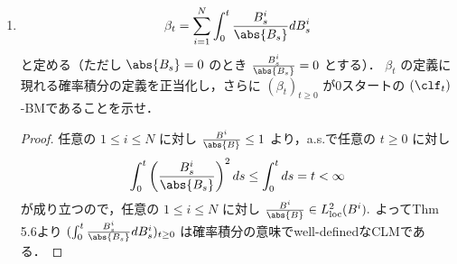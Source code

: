\documentclass{jsarticle}
\begin{document}
\begin{enumerate}
\begin{proof}
        次に $(\sum_{i=1}^{N}\int_{0}^{t}2B_s^i dB_s^i)_{t\ge0}$ がtrue martingaleであることを示す．
        Doob's ineq. in $L^2$ より
        \begin{align}
            E[\gen{\sum_{i=1}^{N}\int_{0}^{\cdot}2B_s^i dB_s^i, \sum_{i=1}^{N}\int_{0}^{\cdot}2B_s^i dB_s^i}_t]
            &= E[\sum_{i=1}^{N}\int_{0}^{t}(2B_s^i)^2 ds] \\
            &\le 4t\sum_{i=1}^{N}E[\sup_{0\le s\le t}(B_s^i)^2] \\
            &\le 4t2^2\sum_{i=1}^{N}E[(B_s^i)^2] \\
            &= 16t(\abs{x}^2+Nt).
        \end{align}
        \begin{screen}
            $\because)$
            任意の $1\le i\le N$ に対し
            \begin{align}
                t
                &= E[(B_t^i-x_i)^2] \\
                &= E[(B_t^i)^2]
                - 2x_iE[B_t^i]
                + E[x_i^2] \\
                &= E[(B_t^i)^2] - x_i^2
            \end{align}
            より $E[(B_t^i)^2]=x_i^2+t.$
        \end{screen}

        よってThm. 4.13(ii)より $(\sum_{i=1}^{N}\int_{0}^{t}2B_s^i dB_s^i)_{t\ge0}$ はtrue martingale.
    \end{proof}
    
    \item
    \begin{align}
        \beta_t
        = \sum_{i=1}^{N}\int_{0}^{t}\frac{B_{s}^{i}}{\abs{B_s}}dB_s^i
    \end{align}
    と定める（ただし $\abs{B_s}=0$ のとき $\frac{B_{s}^{i}}{\abs{B_s}}=0$ とする）．
    $\beta_t$ の定義に現れる確率積分の定義を正当化し，さらに $(\beta_t)_{t\ge0}$ が0スタートの $(\clf_t)$-BMであることを示せ．
    \begin{proof}
        任意の $1\le i\le N$ に対し $\frac{B^i}{\abs{B}}\le1$ より，a.s.で任意の $t\ge0$ に対し
        \begin{align}
            \int_0^t \left(\frac{B_s^i}{\abs{B_s}}\right)^2 ds
            \le \int_0^t ds = t < \infty
        \end{align}
        が成り立つので，任意の $1\le i\le N$ に対し $\frac{B^i}{\abs{B}}\in L_{\mathrm{loc}}^2(B^i).$
        よってThm 5.6より $(\int_{0}^{t}\frac{B_{s}^{i}}{\abs{B_s}}dB_s^i)_{t\ge0}$ は確率積分の意味でwell-definedなCLMである．


\end{proof}
\end{enumerate}
\end{document}
